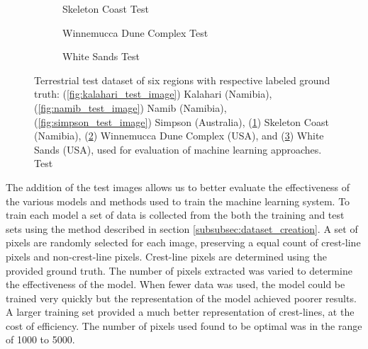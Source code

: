 \begin{figure}
	\ContinuedFloat
	\centering
	\begin{subfigure}{\textwidth}
		\centering
		\caption{ Skeleton Coast Test }
		\label{fig:skeleton_coast_test_image}
	\end{subfigure}
	\begin{subfigure}{\textwidth}
		\centering
		\caption{ Winnemucca Dune Complex Test }
		\label{fig:wdc_test_image}
	\end{subfigure}
	\begin{subfigure}{\textwidth}
		\centering
		\caption{ White Sands Test }
		\label{fig:white_sands_test_image}
	\end{subfigure}
	\caption{Terrestrial test dataset of six regions with respective labeled ground truth: (\ref{fig:kalahari_test_image}) Kalahari (Namibia), (\ref{fig:namib_test_image}) Namib (Namibia), (\ref{fig:simpson_test_image}) Simpson (Australia), (\ref{fig:skeleton_coast_test_image}) Skeleton Coast (Namibia), (\ref{fig:wdc_test_image}) Winnemucca Dune Complex (USA), and (\ref{fig:white_sands_test_image}) White Sands (USA), used for evaluation of machine learning approaches. Test }
	\label{fig:terrestrial_test_dataset}
\end{figure}

The addition of the test images allows us to better evaluate the effectiveness of the various models and methods used to train the machine learning system. To train each model a set of data is collected from the both the training and test sets using the method described in section \ref{subsubsec:dataset_creation}. A set of pixels are randomly selected for each image, preserving a equal count of crest-line pixels and non-crest-line pixels. Crest-line pixels are determined using the provided ground truth. The number of pixels extracted was varied to determine the effectiveness of the model. When fewer data was used, the model could be trained very quickly but the representation of the model achieved poorer results. A larger training set provided a much better representation of crest-lines, at the cost of efficiency. The number of pixels used found to be optimal was in the range of 1000 to 5000.

